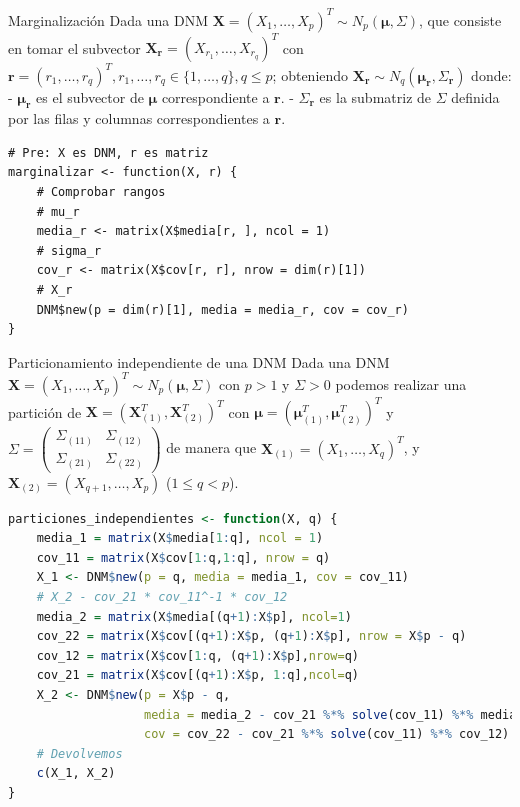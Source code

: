\documentclass[xcolor=table]{beamer}
\begin{document}
\begin{frame}[fragile]{Marginalización}
Dada una DNM $\pmb{X} = (X_1, \ldots, X_p)^T \sim N_p(\pmb{\mu}, \Sigma)$, que consiste en tomar el subvector $\pmb{X}_{\pmb{r}} = (X_{r_1}, \ldots, X_{r_q})^T$ con $\pmb{r} = (r_1, \ldots, r_q)^T, r_1, \ldots, r_q \in \{1, \ldots, q\}, q \leq p $; obteniendo $\pmb{X}_{\pmb{r}} \sim N_q(\pmb{\mu_{\pmb{r}}}, \Sigma_{\pmb{r}})$ donde:
- $\pmb{\mu_{\pmb{r}}}$ es el subvector de $\pmb{\mu}$ correspondiente a $\pmb{r}$.
- $\Sigma_{\pmb{r}}$ es la submatriz de $\Sigma$ definida por las filas y columnas correspondientes a $\pmb{r}$.
\end{frame}

\begin{frame}[fragile]

     
     \begin{lstlisting}
# Pre: X es DNM, r es matriz
marginalizar <- function(X, r) {
    # Comprobar rangos
    # mu_r
    media_r <- matrix(X$media[r, ], ncol = 1)
    # sigma_r
    cov_r <- matrix(X$cov[r, r], nrow = dim(r)[1])
    # X_r
    DNM$new(p = dim(r)[1], media = media_r, cov = cov_r)
}
\end{lstlisting}




\end{frame}

\begin{frame}[fragile]{Particionamiento independiente de una DNM}
Dada una DNM $\pmb{X} = (X_1, \ldots, X_p)^T \sim N_p(\pmb{\mu}, \Sigma)$ con $p > 1$ y $\Sigma > 0$ podemos realizar una partición de $\pmb{X} = (\pmb{X}_{(1)}^T, \pmb{X}_{(2)}^T)^T$ con $\pmb{\mu} = (\pmb{\mu}_{(1)}^T,\pmb{\mu}_{(2)}^T)^T$ y $\Sigma = \begin{pmatrix} \Sigma_{(11)} & \Sigma_{(12)} \\ \Sigma_{(21)} & \Sigma_{(22)} \end{pmatrix} $ de manera que $\pmb{X}_{(1)} = (X_1, \ldots, X_q)^T$, y $\pmb{X}_{(2)} = (X_{q+1}, \ldots, X_p)$ ($1 \leq q < p$).

\end{frame}

\begin{frame}[fragile]
\scriptsize
     \begin{lstlisting}[language=R, basicstyle=\ttfamily]
particiones_independientes <- function(X, q) {
    media_1 = matrix(X$media[1:q], ncol = 1)
    cov_11 = matrix(X$cov[1:q,1:q], nrow = q)
    X_1 <- DNM$new(p = q, media = media_1, cov = cov_11)
    # X_2 - cov_21 * cov_11^-1 * cov_12
    media_2 = matrix(X$media[(q+1):X$p], ncol=1)
    cov_22 = matrix(X$cov[(q+1):X$p, (q+1):X$p], nrow = X$p - q)
    cov_12 = matrix(X$cov[1:q, (q+1):X$p],nrow=q)
    cov_21 = matrix(X$cov[(q+1):X$p, 1:q],ncol=q)
    X_2 <- DNM$new(p = X$p - q,
                   media = media_2 - cov_21 %*% solve(cov_11) %*% media_1,
                   cov = cov_22 - cov_21 %*% solve(cov_11) %*% cov_12)
    # Devolvemos
    c(X_1, X_2)
}
\end{lstlisting}
\end{frame}
\end{document}
